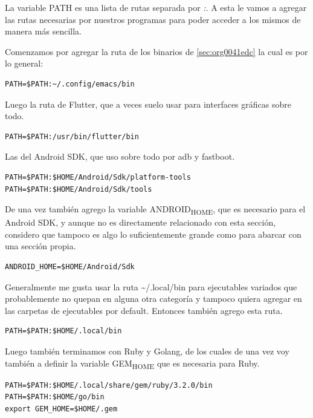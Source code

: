 \documentclass[11pt]{article}
\begin{document}
La variable PATH es una lista de rutas separada por \emph{:}. A esta le vamos a agregar las rutas necesarias por nuestros programas para poder acceder a los mismos de manera más sencilla.

Comenzamos por agregar la ruta de los binarios de \ref{sec:org0041edc} la cual es por lo general:

\begin{verbatim}
PATH=$PATH:~/.config/emacs/bin
\end{verbatim}

Luego la ruta de Flutter, que a veces suelo usar para interfaces gráficas sobre todo.

\begin{verbatim}
PATH=$PATH:/usr/bin/flutter/bin
\end{verbatim}

Las del Android SDK, que uso sobre todo por adb y fastboot.

\begin{verbatim}
PATH=$PATH:$HOME/Android/Sdk/platform-tools
PATH=$PATH:$HOME/Android/Sdk/tools
\end{verbatim}

De una vez también agrego la variable ANDROID\textsubscript{HOME}, que es necesario para el Android SDK, y aunque no es directamente relacionado con esta sección, considero que tampoco es algo lo suficientemente grande como para abarcar con una sección propia.

\begin{verbatim}
ANDROID_HOME=$HOME/Android/Sdk
\end{verbatim}

Generalmente me gusta usar la ruta \textasciitilde{}/.local/bin para ejecutables variados que probablemente no quepan en alguna otra categoría y tampoco quiera agregar en las carpetas de ejecutables por default. Entonces también agrego esta ruta.

\begin{verbatim}
PATH=$PATH:$HOME/.local/bin
\end{verbatim}

Luego también terminamos con Ruby y Golang, de los cuales de una vez voy también a definir la variable GEM\textsubscript{HOME} que es necesaria para Ruby.

\begin{verbatim}
PATH=$PATH:$HOME/.local/share/gem/ruby/3.2.0/bin
PATH=$PATH:$HOME/go/bin
export GEM_HOME=$HOME/.gem

\end{verbatim}
\end{document}
